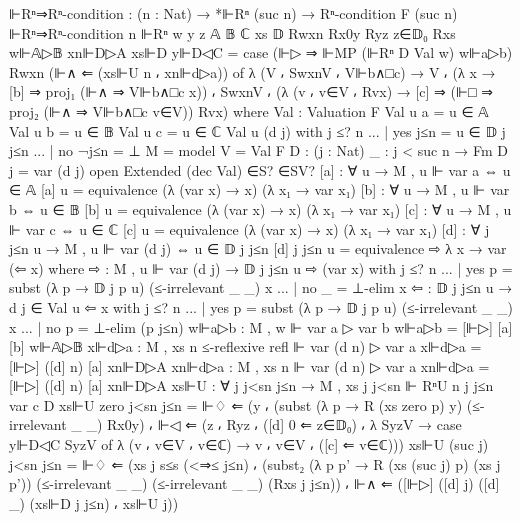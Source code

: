 \begin{spverbatim}
  ⊩Rⁿ⇒Rⁿ-condition : (n : Nat) → *⊩Rⁿ (suc n) → Rⁿ-condition F (suc n)
  ⊩Rⁿ⇒Rⁿ-condition n ⊩Rⁿ {w} {y} {z} {𝔸} {𝔹} {ℂ}
    xs 𝔻 Rwxn Rx0y Ryz z∈𝔻₀ Rxs w⊩𝔸▷𝔹 xn⊩D▷A xs⊩D y⊩D◁C
    = case (⊩▷ ⇒ ⊩MP (⊩Rⁿ D Val w) w⊩a▷b) Rwxn (⊩∧ ⇐ (xs⊩U n ⸴ xn⊩d▷a)) of
      λ { (V ⸴ SwxnV ⸴ V⊩b∧□c) → V ⸴ (λ {x → [b] ⇒ proj₁ (⊩∧ ⇒ V⊩b∧□c x)})
      ⸴ SwxnV ⸴ (λ { (v ⸴ v∈V ⸴ Rvx) → [c] ⇒ (⊩□ ⇒ proj₂ (⊩∧ ⇒ V⊩b∧□c v∈V)) Rvx})}
    where
    Val : Valuation F
    Val u a = u ∈ 𝔸
    Val u b = u ∈ 𝔹
    Val u c = u ∈ ℂ
    Val u (d j) with j ≤? n
    ... | yes j≤n = u ∈ 𝔻 j j≤n
    ... | no ¬j≤n = ⊥
    M = model {V = Val} F
    D : (j : Nat) {_ : j < suc n} → Fm
    D j = var (d j)
    open Extended (dec Val) ∈S? ∈SV?
    [a] : ∀ {u} → M , u ⊩ var a ⇔ u ∈ 𝔸
    [a] {u} = equivalence (λ { (var x) → x}) (λ x₁ → var x₁)
    [b] : ∀ {u} → M , u ⊩ var b ⇔ u ∈ 𝔹
    [b] {u} = equivalence (λ { (var x) → x}) (λ x₁ → var x₁)
    [c] : ∀ {u} → M , u ⊩ var c ⇔ u ∈ ℂ
    [c] {u} = equivalence (λ { (var x) → x}) (λ x₁ → var x₁)
    [d] : ∀ j {j≤n u} → M , u ⊩ var (d j) ⇔ u ∈ 𝔻 j j≤n
    [d] j {j≤n} {u} = equivalence ⇨ λ x → var (⇦ x)
      where
      ⇨ : M , u ⊩ var (d j) → 𝔻 j j≤n u
      ⇨ (var x) with j ≤? n
      ... | yes p = subst (λ p → 𝔻 j p u) (≤-irrelevant _ _) x
      ... | no _ = ⊥-elim x
      ⇦ : 𝔻 j j≤n u → d j ∈ Val u
      ⇦ x with j ≤? n
      ... | yes p = subst (λ p → 𝔻 j p u) (≤-irrelevant _ _) x
      ... | no p = ⊥-elim (p j≤n)
    w⊩a▷b : M , w ⊩ var a ▷ var b
    w⊩a▷b = [⊩▷] [a] [b] w⊩𝔸▷𝔹
    x⊩d▷a : M , xs n {≤-reflexive refl} ⊩ var (d n) ▷ var a
    x⊩d▷a = [⊩▷] ([d] n) [a] xn⊩D▷A
    xn⊩d▷a : M , xs n ⊩ var (d n) ▷ var a
    xn⊩d▷a = [⊩▷] ([d] n) [a] xn⊩D▷A
    xs⊩U : ∀ j {j<sn j≤n} → M , xs j {j<sn} ⊩ RⁿU n j {j≤n} {var c} {D}
    xs⊩U zero {j<sn} {j≤n} = ⊩♢ ⇐ (y ⸴ (subst (λ p → R (xs zero {p}) y) (≤-irrelevant _ _) Rx0y)
      ⸴ ⊩◁ ⇐ (z ⸴ Ryz ⸴ ([d] 0 ⇐ z∈𝔻₀) ⸴ λ {SyzV → case y⊩D◁C SyzV of
       λ { (v ⸴ v∈V ⸴ v∈ℂ) → v ⸴ v∈V ⸴ ([c] ⇐ v∈ℂ)}}))
    xs⊩U (suc j) {j<sn} {j≤n} = ⊩♢ ⇐ (xs j {s≤s (<⇒≤ j≤n)} ⸴ (subst₂ (λ p p' →
      R (xs (suc j) {p}) (xs j {p'})) (≤-irrelevant _ _) (≤-irrelevant _ _) (Rxs j j≤n))
      ⸴ ⊩∧ ⇐ ([⊩▷] ([d] j) ([d] _) (xs⊩D j j≤n) ⸴ xs⊩U j))
\end{spverbatim}
